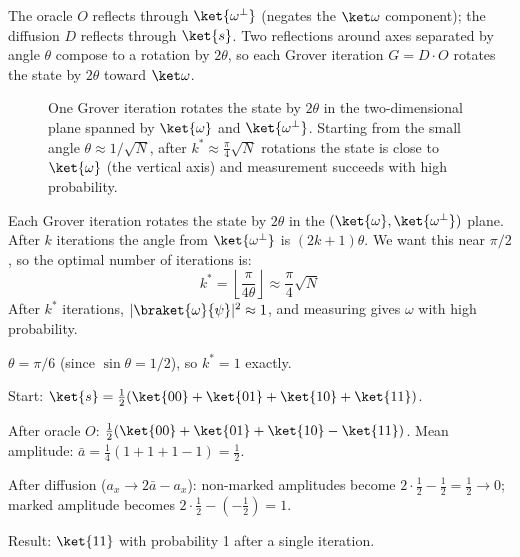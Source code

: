 \documentclass[oneside]{academica}
\begin{document}
The oracle $O$ reflects through $\ket{\omega^\perp}$ (negates the $\ket\omega$ component); the diffusion $D$ reflects through $\ket{s}$.
Two reflections around axes separated by angle $\theta$ compose to a rotation by $2\theta$, so each Grover iteration $G = D\cdot O$ rotates the state by $2\theta$ toward $\ket\omega$.

\begin{figure}[H]
  \centering
  \caption{One Grover iteration rotates the state by $2\theta$ in the two-dimensional plane spanned by $\ket{\omega}$ and $\ket{\omega^\perp}$.
    Starting from the small angle $\theta\approx1/\sqrt{N}$, after $k^*\approx\frac\pi4\sqrt{N}$ rotations the state is close to $\ket{\omega}$ (the vertical axis) and measurement succeeds with high probability.
  }
\end{figure}

Each Grover iteration rotates the state by $2\theta$ in the $(\ket{\omega},\ket{\omega^\perp})$ plane.
After $k$ iterations the angle from $\ket{\omega^\perp}$ is $(2k+1)\theta$.
We want this near $\pi/2$, so the optimal number of iterations is:
\begin{equation*}
  k^*=\left\lfloor\frac{\pi}{4\theta}\right\rfloor\approx\frac{\pi}{4}\sqrt{N}
\end{equation*}
After $k^*$ iterations, $|\braket{\omega}{\psi}|^2\approx1$, and measuring gives $\omega$ with high probability.

\begin{example*}[Grover with $N=4$, $\omega=\ket{11}$]
  $\theta=\pi/6$ (since $\sin\theta=1/2$), so $k^*=1$ exactly.
  
  Start: $\ket{s}=\frac{1}{2}(\ket{00}+\ket{01}+\ket{10}+\ket{11})$.
  
  After oracle $O$: $\frac{1}{2}(\ket{00}+\ket{01}+\ket{10}-\ket{11})$.
  Mean amplitude: $\bar a=\frac{1}{4}(1+1+1-1)=\frac{1}{2}$.
  
  After diffusion ($a_x\to 2\bar a - a_x$): non-marked amplitudes become $2\cdot\frac12-\frac12=\frac12\to 0$; marked amplitude becomes $2\cdot\frac12-(-\frac12)=1$.
  
  Result: $\ket{11}$ with probability 1 after a single iteration.
\end{example*}
\end{document}
